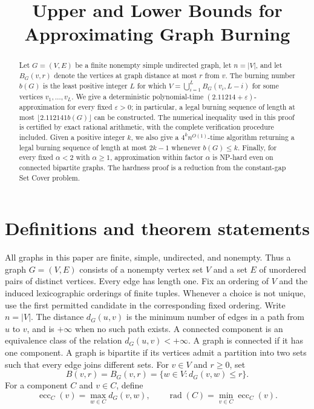 \documentclass[11pt]{article}
\title{Upper and Lower Bounds for Approximating Graph Burning}
\author{}
\date{}
\numberwithin{equation}{section}
\theoremstyle{definition}
\newcommand{\ecc}{\operatorname{ecc}}
\newcommand{\rad}{\operatorname{rad}}
\begin{document}
\maketitle
\begin{abstract}
Let $G=(V,E)$ be a finite nonempty simple undirected graph, let
$n=|V|$, and let $B_G(v,r)$ denote the vertices at graph distance at most
$r$ from $v$. The burning number $b(G)$ is the least positive integer
$L$ for which $V=\bigcup_{i=1}^{L}B_G(v_i,L-i)$ for some vertices
$v_1,\ldots,v_L$. We give a deterministic polynomial-time
$(2.11214+\varepsilon)$-approximation for every fixed $\varepsilon>0$;
in particular, a legal burning sequence of length at most $\lfloor2.112141b(G)\rfloor$
can be constructed. The numerical inequality used in this proof is
certified by exact rational arithmetic, with the complete verification
procedure included. Given a positive integer $k$, we also give a $4^k n^{O(1)}$-time
algorithm returning a legal burning sequence of length at most $2k-1$
whenever $b(G)\le k$.
Finally, for every fixed $\alpha<2$ with $\alpha\ge1$, approximation
within factor $\alpha$ is NP-hard even on connected bipartite graphs.
The hardness proof is a reduction from the constant-gap Set Cover problem.
\end{abstract}

\section{Definitions and theorem statements}\label{sec:definitions}

All graphs in this paper are finite, simple, undirected, and nonempty.
Thus a graph $G=(V,E)$ consists of a nonempty vertex set $V$ and a set
$E$ of unordered pairs of distinct vertices. Every edge has length one.
Fix an ordering of $V$ and the induced lexicographic orderings of finite
tuples. Whenever a choice is not unique, use the first permitted
candidate in the corresponding fixed ordering.
Write $n=|V|$. The distance $d_G(u,v)$ is the minimum number of edges in
a path from $u$ to $v$, and is $+\infty$ when no such path exists.
A connected component is an equivalence class of the relation
$d_G(u,v)<+\infty$. A graph is connected if it has one component.
A graph is bipartite if its vertices admit a partition into two sets
such that every edge joins different sets. For $v\in V$ and $r\ge0$, set
\[
 B(v,r)=B_G(v,r)=\{w\in V:d_G(v,w)\le r\}.
\]
For a component $C$ and $v\in C$, define
\[
 \ecc_C(v)=\max_{w\in C}d_G(v,w),\qquad
 \rad(C)=\min_{v\in C}\ecc_C(v).
\]
\end{document}
